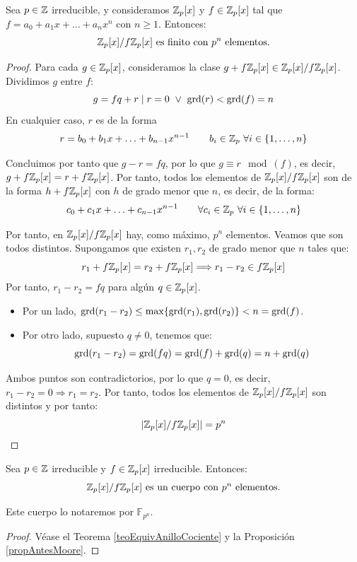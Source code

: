 \begin{prop}
    \label{propAntesMoore}
    Sea $p \in \mathbb Z$ irreducible, y consideramos $\mathbb Z_p[x]$ y $f \in \mathbb Z_p[x]$ tal que $f = a_0 + a_1x + \ldots + a_nx^n$ con $n\geq1$.
    Entonces:
    $$\mathbb Z_p[x]/f\mathbb Z_p[x]\text{ es finito con } p^n \text{ elementos.}$$
\begin{proof}
    Para cada $g \in \mathbb Z_p[x]$, consideramos la clase $g+f\mathbb Z_p[x] \in \mathbb Z_p[x]/f\mathbb Z_p[x]$. Dividimos $g$ entre $f$:
    $$g=fq+r \mid r=0 \ \lor \  \operatorname{grd}(r)<\operatorname{grd}(f)=n$$
    En cualquier caso, $r$ es de la forma
    $$r=b_0+b_1x+\ldots+b_{n-1}x^{n-1}\qquad b_i \in \mathbb Z_p ~\forall i \in \{1, \ldots, n\}$$

    Concluimos por tanto que $g-r=fq$, por lo que $g\equiv r\mod(f)$, es decir, $g+f\mathbb Z_p[x] = r+f\mathbb Z_p[x]$. Por tanto, todos los elementos de $\mathbb Z_p[x]/f\mathbb Z_p[x]$ son de la forma $h+f\mathbb Z_p[x]$ con $h$ de grado menor que $n$, es decir, de la forma:
    $$c_0 + c_1x + \ldots + c_{n-1}x^{n-1}\qquad \forall c_i \in \mathbb Z_p~\forall i \in \{1, \ldots, n\}$$

    Por tanto, en $\mathbb Z_p[x]/f\mathbb Z_p[x]$ hay, como máximo, $p^n$ elementos. Veamos que son todos distintos. Supongamos que existen $r_1, r_2$ de grado menor que $n$ tales que:
    $$r_1 + f\mathbb Z_p[x] = r_2 + f\mathbb Z_p[x] \Longrightarrow r_1 - r_2 \in f\mathbb Z_p[x]$$
    Por tanto, $r_1 - r_2 = fq$ para algún $q \in \mathbb Z_p[x]$.
    \begin{itemize}
        \item Por un lado, $\operatorname{grd}(r_1 - r_2) \leq \max\{\operatorname{grd}(r_1), \operatorname{grd}(r_2)\} < n = \operatorname{grd}(f)$.
        \item Por otro lado, supuesto $q\neq 0$, tenemos que:
        \begin{equation*}
            \operatorname{grd}(r_1 - r_2) = \operatorname{grd}(fq) = \operatorname{grd}(f) + \operatorname{grd}(q) = n + \operatorname{grd}(q)
        \end{equation*}
    \end{itemize}

    Ambos puntos son contradictorios, por lo que $q=0$, es decir, $r_1 - r_2 = 0 \Longrightarrow r_1 = r_2$. Por tanto, todos los elementos de $\mathbb Z_p[x]/f\mathbb Z_p[x]$ son distintos y por tanto:
    $$|\mathbb Z_p[x]/f\mathbb Z_p[x]| = p^n$$
\end{proof}
\end{prop}

\begin{teo}
    Sea $p \in \mathbb Z$ irreducible y $f \in \mathbb Z_p[x]$ irreducible. Entonces:
    $$\mathbb Z_p[x]/f\mathbb Z_p[x] \text{ es un cuerpo con } p^n \text{ elementos.}$$

    Este cuerpo lo notaremos por $\mathbb{F}_{p^n}$.
\begin{proof}
    Véase el Teorema \ref{teoEquivAnilloCociente} y la Proposición \ref{propAntesMoore}.
\end{proof}
\end{teo}

